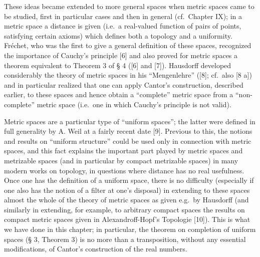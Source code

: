 These ideas became extended to more general spaces when metric spaces came to be studied, first in particular cases and then in general (cf.~Chapter IX); in a metric space a distance is given (i.e.~a real-valued function of pairs of points, satisfying certain axioms) which defines both a topology and a uniformity. Fréchet, who was the first to give a general definition of these spaces, recognized the importance of Cauchy's principle {[}6{]} and also proved for metric spaces a theorem equivalent to Theorem 3 of § 4 ({[}6{]} and {[}7{]}). Hausdorff developed considerably the theory of metric spaces in his ``Mengenlehre'' ({[}8{]}; cf.~also {[}8 a{]}) and in particular realized that one can apply Cantor's construction, described earlier, to these spaces and hence obtain a ``complete'' metric space from a ``non-complete'' metric space (i.e.~one in which Cauchy's principle is not valid).

Metric spaces are a particular type of ``uniform spaces''; the latter were defined in full generality by A. Weil at a fairly recent date {[}9{]}. Previous to this, the notions and results on ``uniform structure'' could be used only in connection with metric spaces, and this fact explains the important part played by metric spaces and metrizable spaces (and in particular by compact metrizable spaces) in many modern works on topology, in questions where distance has no real usefulness. Once one has the definition of a uniform space, there is no difficulty (especially if one also has the notion of a filter at one's disposal) in extending to these spaces almost the whole of the theory of metric spaces as given e.g.~by Hausdorff (and similarly in extending, for example, to arbitrary compact spaces the results on compact metric spaces given in Alexandroff-Hopf's Topologie {[}10{]}). This is what we have done in this chapter; in particular, the theorem on completion of uniform spaces (§ 3, Theorem 3) is no more than a transposition, without any essential modifications, of Cantor's construction of the real numbers.

